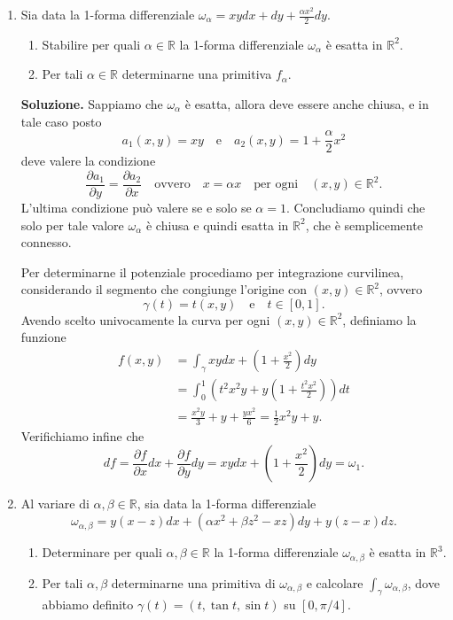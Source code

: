 \begin{enumerate}
	\textbf{Soluzione.}
		Una primitiva di $\omega$ è $f(x,y,z) = x^2 y z + x y^2 z - x y + 2z x + z - 4y$, di conseguenza
		\[
		\int_{\gamma} \omega = f(0,\pi,e^\pi) - f(0,0,1) = e^\pi - 4\pi - 1.
		\]
	
	
	\item Sia data la 1-forma differenziale $\omega_{\alpha} = xy dx + dy + \frac{\alpha x^2}{2} dy$.
	\begin{enumerate}
		\item Stabilire per quali $\alpha \in \mathbb{R}$ la 1-forma differenziale $\omega_{\alpha}$ è esatta in $\mathbb{R}^2$.
		\item Per tali $\alpha \in \mathbb{R}$ determinarne una primitiva $f_{\alpha}$.
	\end{enumerate}
	
	\textbf{Soluzione.}
		Sappiamo che $\omega_{\alpha}$ è esatta, allora deve essere anche chiusa, e in tale caso posto
		\[
		a_1(x,y) = xy \quad \text{e} \quad a_2(x,y) = 1 + \frac{\alpha}{2} x^2
		\]
		deve valere la condizione
		\[
		\frac{\partial a_1}{\partial y} = \frac{\partial a_2}{\partial x} \quad \text{ovvero} \quad x = \alpha x \quad \text{per ogni} \quad (x,y) \in \mathbb{R}^2.
		\]
		L'ultima condizione può valere se e solo se $\alpha = 1$. Concludiamo quindi che solo per tale valore $\omega_{\alpha}$ è chiusa e quindi esatta in $\mathbb{R}^2$, che è semplicemente connesso.
		
		Per determinarne il potenziale procediamo per integrazione curvilinea, considerando il segmento che congiunge l'origine con $(x,y) \in \mathbb{R}^2$, ovvero
		\[
		\gamma(t) = t(x,y) \quad \text{e} \quad t \in [0,1].
		\]
		Avendo scelto univocamente la curva per ogni $(x,y) \in \mathbb{R}^2$, definiamo la funzione
		\[
		\begin{aligned}
			f(x,y) &= \int_{\gamma} xy dx + \left(1 + \frac{x^2}{2}\right) dy \\
			&= \int_0^1 \left(t^2 x^2 y + y \left(1 + \frac{t^2 x^2}{2}\right)\right) dt \\
			&= \frac{x^2 y}{3} + y + \frac{y x^2}{6} = \frac{1}{2} x^2 y + y.
		\end{aligned}
		\]
		Verifichiamo infine che
		\[
		df = \frac{\partial f}{\partial x} dx + \frac{\partial f}{\partial y} dy = xy dx + \left(1 + \frac{x^2}{2}\right) dy = \omega_1.
		\]
	
	
	\item Al variare di $\alpha, \beta \in \mathbb{R}$, sia data la 1-forma differenziale
	\[
	\omega_{\alpha,\beta} = y(x - z) dx + (\alpha x^2 + \beta z^2 - x z) dy + y(z - x) dz.
	\]
	\begin{enumerate}
		\item Determinare per quali $\alpha, \beta \in \mathbb{R}$ la 1-forma differenziale $\omega_{\alpha,\beta}$ è esatta in $\mathbb{R}^3$.
		\item Per tali $\alpha, \beta$ determinarne una primitiva di $\omega_{\alpha,\beta}$ e calcolare $\int_{\gamma} \omega_{\alpha,\beta}$, dove abbiamo definito $\gamma(t) = (t, \tan t, \sin t)$ su $[0, \pi/4]$.
	\end{enumerate}
	

\end{enumerate}

